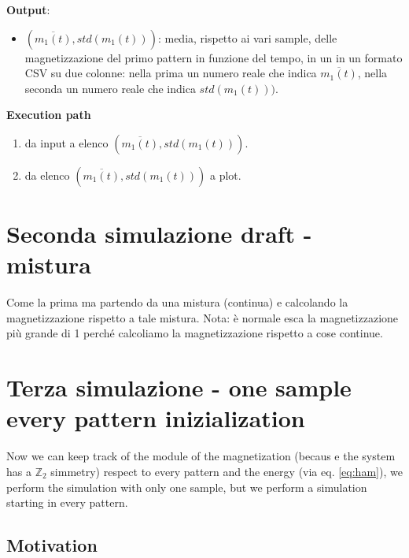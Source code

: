 \documentclass[a4paper,10pt]{article}
\begin{document}
\textbf{Output}:
\begin{itemize}
 \item $(\overline{m_1(t)}, std(m_1(t)))$: media, rispetto ai vari sample, delle magnetizzazione del primo pattern in funzione del tempo, in un in un formato CSV su due colonne: nella prima un numero reale che indica $\overline{m_1(t)}$, nella seconda un numero reale che indica $std(m_1(t)))$.
\end{itemize}

\textbf{Execution path}
\begin{enumerate}
 \item da input a elenco $(\overline{m_1(t)}, std(m_1(t)))$.
 \item da elenco $(\overline{m_1(t)}, std(m_1(t)))$ a plot.
\end{enumerate}

\section{Seconda simulazione draft - mistura}

Come la prima ma partendo da una mistura (continua) e calcolando la magnetizzazione rispetto a tale mistura.
Nota: è normale esca la magnetizzazione più grande di 1 perché calcoliamo la magnetizzazione rispetto a cose continue.

\section{Terza simulazione - one sample every pattern inizialization}

Now we can keep track of the module of the magnetization (becaus e the system has a $\mathbb{Z}_2$ simmetry) respect to every pattern and the energy (via eq. \ref{eq:ham}), we perform the simulation with only one sample, but we perform a simulation starting in every pattern.

\subsection{Motivation}
\end{document}
